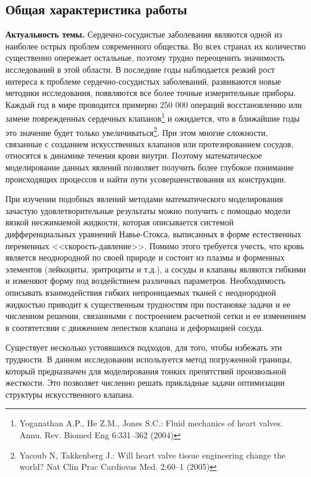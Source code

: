 \subsection*{\Large Общая характеристика работы}
\fontsize{14pt}{15pt}\selectfont
\textbf{Актуальность темы.}
Сердечно-сосудистые заболевания являются одной из наиболее острых проблем современного общества. Во всех странах их количество существенно опережает остальные, поэтому трудно переоценить значимость исследований в этой области. В последние годы наблюдается резкий рост интереса к проблеме сердечно-сосудистых заболеваний, развиваются новые методики исследования, появляются все более точные измерительные приборы. Каждый год в мире проводится примерно 250 000 операций восстановлению или замене поврежденных сердечных клапанов\footnote{
    Yoganathan A.P., He Z.M., Jones S.C.: Fluid mechanics of heart valves. Annu. Rev. Biomed Eng 6:331--362 (2004)
} %
и ожидается, что в ближайшие годы это значение будет только увеличиваться\footnote{
    Yacoub N, Takkenberg J.: Will heart valve tissue engineering change the world? Nat Clin Prac Cardiovas Med. 2:60--1 (2005)
}. При этом многие сложности, связанные с созданием искусственных клапанов или протезированием сосудов, относятся к динамике течения крови внутри. Поэтому математическое моделирование данных явлений позволяет получить более глубокое понимание происходящих процессов и найти пути усовершенствования их конструкции. 

При изучении подобных явлений методами математического моделирования зачастую удовлетворительные результаты можно получить с помощью модели вязкой несжимаемой жидкости, которая описывается системой дифференциальных уравнений Навье-Стокса, выписанных в форме естественных переменных <<скорость-давление>>. Помимо этого требуется учесть, что кровь является неоднородной по своей природе и состоит из плазмы и форменных элементов (лейкоциты, эритроциты и т.д.), а сосуды и клапаны являются гибкими и изменяют форму под воздействием различных параметров. Необходимость описывать взаимодействия гибких непроницаемых тканей с неоднородной жидкостью приводит к существенным трудностям при постановке задачи и ее численном решении, связанными с построением расчетной сетки и ее изменением в соотвтетсвии с движением лепестков клапана и деформацией сосуда. 

Существует несколько устоявшихся подходов, для того, чтобы избежать эти трудности. В данном исследовании используется метод погруженной границы, который предназначен для моделирования тонких препятствий произвольной жесткости. Это позволяет численно решать прикладные задачи оптимизации структуры искусственного клапана.


